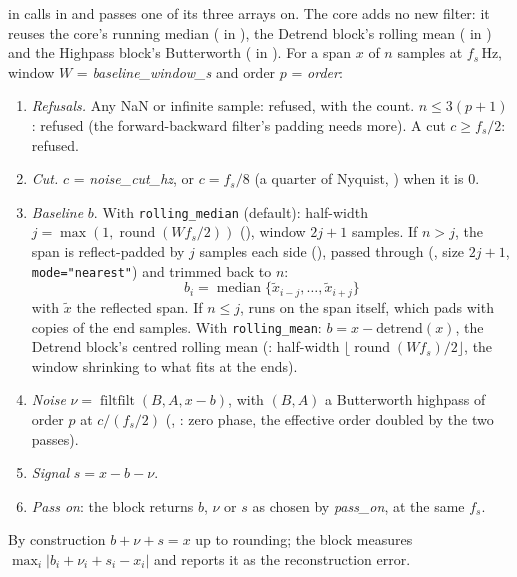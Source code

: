  in  calls  in
 and passes one of its three arrays on. The core adds
no new filter: it reuses the core's running median ( in
), the Detrend block's rolling mean
( in ) and the Highpass
block's Butterworth ( in
). For a span $x$ of $n$ samples at $f_s$\,Hz,
window $W$ = \emph{baseline\_window\_s} and order $p$ = \emph{order}:
\begin{enumerate}
\item \emph{Refusals.} Any NaN or infinite sample: refused, with the count. $n \le 3(p+1)$:
  refused (the forward-backward filter's padding needs more). A cut $c \ge f_s/2$: refused.
\item \emph{Cut.} $c$ = \emph{noise\_cut\_hz}, or $c = f_s/8$ (a quarter of Nyquist,
  ) when it is 0.
\item \emph{Baseline} $b$. With \texttt{rolling\_median} (default): half-width
  $j = \max(1, \operatorname{round}(W f_s/2))$ (), window $2j+1$
  samples. If $n > j$, the span is reflect-padded by $j$ samples each side
  (), passed through 
  (, size $2j+1$, \texttt{mode="nearest"}) and trimmed back to
  $n$:
  \[ b_i = \operatorname{median}\{\tilde x_{i-j},\ldots,\tilde x_{i+j}\} \]
  with $\tilde x$ the reflected span. If $n \le j$,  runs on the span
  itself, which pads with copies of the end samples. With \texttt{rolling\_mean}:
  $b = x - \text{detrend}(x)$, the Detrend block's centred rolling mean (:
  half-width $\lfloor \operatorname{round}(W f_s)/2\rfloor$, the window shrinking to what fits
  at the ends).
\item \emph{Noise} $\nu = \operatorname{filtfilt}(B, A, x - b)$, with $(B, A)$ a Butterworth
  highpass of order $p$ at $c/(f_s/2)$ (, : zero
  phase, the effective order doubled by the two passes).
\item \emph{Signal} $s = x - b - \nu$.
\item \emph{Pass on}: the block returns $b$, $\nu$ or $s$ as chosen by \emph{pass\_on}, at
  the same $f_s$.
\end{enumerate}
By construction $b + \nu + s = x$ up to rounding; the block measures
$\max_i |b_i + \nu_i + s_i - x_i|$ and reports it as the reconstruction error.

